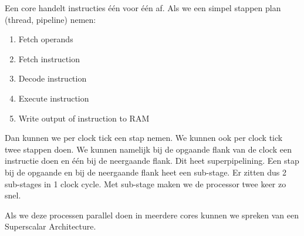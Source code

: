 Een core handelt instructies \'e\'en voor \'e\'en af. Als we een simpel stappen plan (thread, pipeline) nemen:
\begin{enumerate}
\item Fetch operands
\item Fetch instruction
\item Decode instruction
\item Execute instruction
\item Write output of instruction to RAM
\end{enumerate}
Dan kunnen we per clock tick een stap nemen. We kunnen ook per clock tick twee stappen doen. We kunnen namelijk bij de opgaande flank van de clock een instructie doen en \'e\'en bij de neergaande flank. Dit heet superpipelining. Een stap bij de opgaande en bij de neergaande flank heet een sub-stage. Er zitten dus 2 sub-stages in 1 clock cycle. Met sub-stage maken we de processor twee keer zo snel.

Als we deze processen parallel doen in meerdere cores kunnen we spreken van een Superscalar Architecture.

